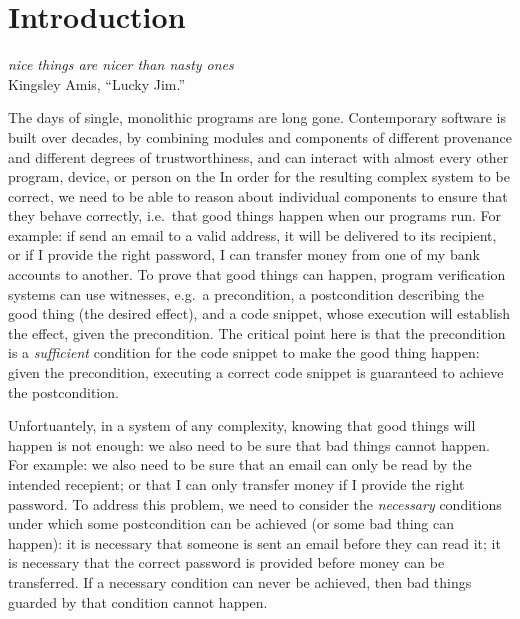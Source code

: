 \section{Introduction}

\begin{flushright}
  \textit{nice things are nicer than nasty ones}\\
  Kingsley Amis, ``Lucky Jim.''
\end{flushright}

The days of single, monolithic programs are long gone.  Contemporary
software is built over decades, by combining modules and components of
different provenance and different degrees of trustworthiness, and can
interact with almost every other program, device, or person on the In
order for the resulting complex system to be correct, we need to be
able to reason about individual components to ensure that they behave
correctly, i.e.\ that good things happen when our programs run.
For example: if send an email to a valid address, it will be
delivered to its recipient, or if I provide the right password, I can
transfer money from one of my bank accounts to another. 
To prove that good things can
happen, program verification systems can use witnesses, e.g.\ a
precondition, a postcondition describing the good thing (the desired
effect), and a code snippet, whose execution will establish the
effect, given the precondition.  The critical point here is that the
precondition is a \emph{sufficient} condition for the code snippet to
make the good thing happen: given the precondition, executing a
correct code snippet is guaranteed to achieve the postcondition.

Unfortuantely, in a system of any complexity, knowing that good things
will happen is not enough: we also need to be sure that bad things
cannot happen. For example: we also need to be sure that an email can
only be read by the intended recepient; or that I can only transfer
money if I provide the right password. To address this problem,
we need to consider the \emph{necessary} conditions under which some
postcondition can be achieved (or some bad thing can happen):
it is necessary that someone is sent an email before they can read it;
it is necessary that the correct password is provided before money can
be transferred.  If a necessary condition can never be achieved, then
bad things guarded by that condition cannot happen.

